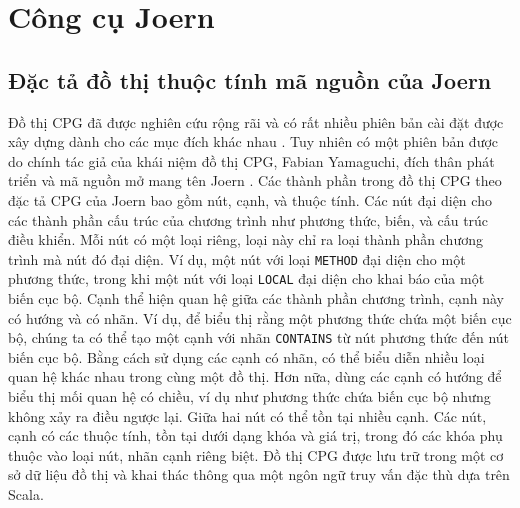 \section{Công cụ Joern}

\subsection{Đặc tả đồ thị thuộc tính mã nguồn của Joern}


Đồ thị CPG đã được nghiên cứu rộng rãi và có rất nhiều phiên bản cài đặt được xây dựng dành cho các mục đích khác nhau \cite{ kuchler2022representing, weiss2022language, keirsgieter2020graft}.
Tuy nhiên có một phiên bản được do chính tác giả của khái niệm đồ thị CPG, Fabian Yamaguchi, đích thân phát triển và mã nguồn mở mang tên Joern \cite{joernJoernHunteraposs}.
Các thành phần trong đồ thị CPG theo đặc tả CPG của Joern bao gồm nút, cạnh, và thuộc tính.
Các nút đại diện cho các thành phần cấu trúc của chương trình như phương thức, biến, và cấu trúc điều khiển.
Mỗi nút có một loại riêng, loại này chỉ ra loại thành phần chương trình mà nút đó đại diện.
Ví dụ, một nút với loại \texttt{METHOD} đại diện cho một phương thức, trong khi một nút với loại \texttt{LOCAL} đại diện cho khai báo của một biến cục bộ.
Cạnh thể hiện quan hệ giữa các thành phần chương trình, cạnh này có hướng và có nhãn.
Ví dụ, để biểu thị rằng một phương thức chứa một biến cục bộ, chúng ta có thể tạo một cạnh với nhãn \texttt{CONTAINS} từ nút phương thức đến nút biến cục bộ.
Bằng cách sử dụng các cạnh có nhãn, có thể biểu diễn nhiều loại quan hệ khác nhau trong cùng một đồ thị.
Hơn nữa, dùng các cạnh có hướng để biểu thị mối quan hệ có chiều, ví dụ như phương thức chứa biến cục bộ nhưng không xảy ra điều ngược lại.
Giữa hai nút có thể tồn tại nhiều cạnh.
Các nút, cạnh có các thuộc tính, tồn tại dưới dạng khóa và giá trị, trong đó các khóa phụ thuộc vào loại nút, nhãn cạnh riêng biệt.
Đồ thị CPG được lưu trữ trong một cơ sở dữ liệu đồ thị và khai thác thông qua một ngôn ngữ truy vấn đặc thù dựa trên Scala.

